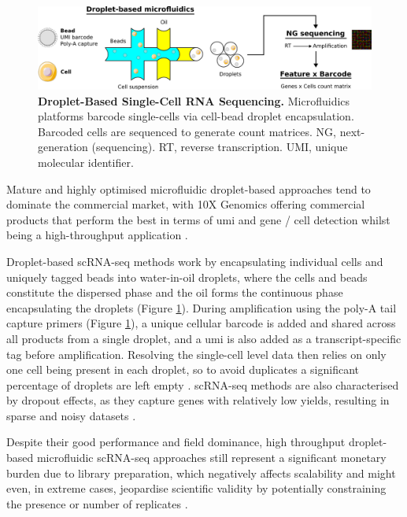 \begin{figure}[H]
    \centering
    \includegraphics{01intro/figs/1TECH_scRNAseq.png}
    \caption{\textbf{Droplet-Based Single-Cell RNA Sequencing.} Microfluidics platforms barcode single-cells via cell-bead droplet encapsulation. Barcoded cells are sequenced to generate count matrices. NG, next-generation (sequencing). RT, reverse transcription. UMI, unique molecular identifier.}
    \label{fig:1tech}
\end{figure}

Mature and highly optimised microfluidic droplet-based approaches tend to dominate the commercial market, with 10X Genomics offering commercial products \cite{kitzman_haplotypes_2016} that perform the best in terms of \acrshort{umi} and gene / cell detection whilst being a high-throughput application \cite{ding_systematic_2020}.

Droplet-based scRNA-seq methods work by encapsulating individual cells and uniquely tagged beads into water-in-oil droplets, where the cells and beads constitute the dispersed phase and the oil forms the continuous phase encapsulating the droplets \cite{macosko_highly_2015} (Figure \ref{fig:1tech}). During amplification using the poly-A tail capture primers (Figure \ref{fig:1tech}), a unique cellular barcode is added and shared across all products from a single droplet, and a \acrfull{umi} is also added as a transcript-specific tag before amplification.
Resolving the single-cell level data then relies on only one cell being present in each droplet, so to avoid duplicates a significant percentage of droplets are left empty \cite{abate_beating_2009}. scRNA-seq methods are also characterised by dropout effects, as they capture genes with relatively low yields, resulting in sparse and noisy datasets \cite{qiu_embracing_2020}. 

Despite their good performance and field dominance, high throughput droplet-based microfluidic scRNA-seq approaches still represent a significant monetary burden due to library preparation, which negatively affects scalability and might even, in extreme cases, jeopardise scientific validity by potentially constraining the presence or number of replicates \cite{zimmerman_practical_2021}.

